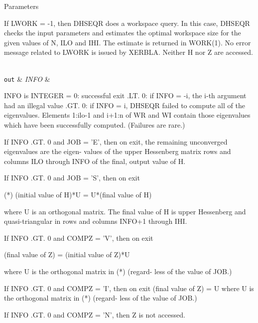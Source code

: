 \begin{DoxyParams}[1]{Parameters}
\begin{DoxyVerb}
           If LWORK = -1, then DHSEQR does a workspace query.
           In this case, DHSEQR checks the input parameters and
           estimates the optimal workspace size for the given
           values of N, ILO and IHI.  The estimate is returned
           in WORK(1).  No error message related to LWORK is
           issued by XERBLA.  Neither H nor Z are accessed.\end{DoxyVerb}
\\
\hline
\mbox{\tt out}  & {\em I\+N\+F\+O} & \begin{DoxyVerb}          INFO is INTEGER
             =  0:  successful exit
           .LT. 0:  if INFO = -i, the i-th argument had an illegal
                    value
           .GT. 0:  if INFO = i, DHSEQR failed to compute all of
                the eigenvalues.  Elements 1:ilo-1 and i+1:n of WR
                and WI contain those eigenvalues which have been
                successfully computed.  (Failures are rare.)

                If INFO .GT. 0 and JOB = 'E', then on exit, the
                remaining unconverged eigenvalues are the eigen-
                values of the upper Hessenberg matrix rows and
                columns ILO through INFO of the final, output
                value of H.

                If INFO .GT. 0 and JOB   = 'S', then on exit

           (*)  (initial value of H)*U  = U*(final value of H)

                where U is an orthogonal matrix.  The final
                value of H is upper Hessenberg and quasi-triangular
                in rows and columns INFO+1 through IHI.

                If INFO .GT. 0 and COMPZ = 'V', then on exit

                  (final value of Z)  =  (initial value of Z)*U

                where U is the orthogonal matrix in (*) (regard-
                less of the value of JOB.)

                If INFO .GT. 0 and COMPZ = 'I', then on exit
                      (final value of Z)  = U
                where U is the orthogonal matrix in (*) (regard-
                less of the value of JOB.)

                If INFO .GT. 0 and COMPZ = 'N', then Z is not
                accessed.\end{DoxyVerb}
 \\
\hline
\end{DoxyParams}
